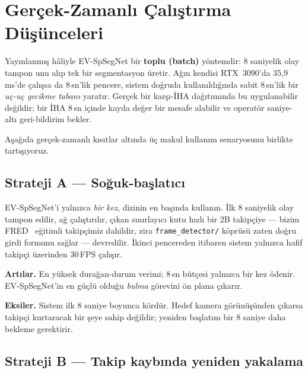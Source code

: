 \documentclass[11pt,a4paper]{article}
\begin{document}
\section{Ger\c{c}ek-Zamanl{\i} \c{C}al{\i}\c{s}t{\i}rma D\"u\c{s}\"unceleri}\label{sec:realtime}
Yay{\i}nlanm{\i}\c{s} h\^aliyle EV-SpSegNet bir \textbf{toplu (batch)}
y\"ontemdir: 8 saniyelik olay tampon\hskip0pt unu al{\i}p tek bir
segmentasyon \"uretir. A\u{g}{\i}n kendisi RTX~3090'da 35{,}9\,ms'de
\c{c}al{\i}\c{s}sa da 8\,sn'lik pencere, sistem do\u{g}ruda kullan{\i}ld{\i}\u{g}{\i}nda
sabit 8\,sn'lik bir \emph{u\c{c}-u\c{c} gecikme taban{\i}}
yarat{\i}r. Ger\c{c}ek bir kar\c{s}{\i}-\.{I}HA da\u{g}{\i}t{\i}m{\i}nda
bu uygulanabilir de\u{g}ildir; bir \.{I}HA 8\,sn i\c{c}inde
kayda de\u{g}er bir mesafe alabilir ve operat\"or saniye-alt{\i}
geri-bildirim bekler.

A\c{s}a\u{g}{\i}da ger\c{c}ek-zamanl{\i} k{\i}s{\i}tlar alt{\i}nda \"u\c{c}
makul kullan{\i}m senaryosunu birlikte tart{\i}\c{s}{\i}yoruz.

\subsection{Strateji A --- So\u{g}uk-ba\c{s}lat{\i}c{\i}}

EV-SpSegNet'i yaln{\i}zca \emph{bir kez}, dizinin en ba\c{s}{\i}nda
kullan{\i}n. \.{I}lk 8 saniyelik olay tampon edilir, a\u{g}
\c{c}al{\i}\c{s}t{\i}r{\i}l{\i}r, \c{c}{\i}kan s{\i}n{\i}rlay{\i}c{\i}
kutu h{\i}zl{\i} bir 2B takip\c{c}iye --- bizim FRED~\cite{magrini2025fred}
e\u{g}itimli takip\c{c}imiz dahildir, zira
\texttt{frame\_detector/} k\"opr\"us\"u zaten do\u{g}ru girdi
formunu sa\u{g}lar --- devredilir. \.{I}kinci pencereden itibaren
sistem yaln{\i}zca hafif takip\c{c}i \"uzerinden 30\,FPS \c{c}al{\i}\c{s}{\i}r.

\textbf{Art{\i}lar.} En y\"uksek dura\u{g}an-durum verimi; 8\,sn
b\"ut\c{c}esi yaln{\i}zca bir kez \"odenir. EV-SpSegNet'in en
g\"u\c{c}l\"u oldu\u{g}u \emph{bulma} g\"orevini \"on plana
\c{c}{\i}kar{\i}r.

\textbf{Eksiler.} Sistem ilk 8 saniye boyunca k\"ord\"ur. Hedef
kamera g\"or\"un\"u\c{s}\"unden \c{c}{\i}karsa takip\c{c}i kurtaracak
bir \c{s}eye sahip de\u{g}ildir; yeniden ba\c{s}lat{\i}m bir 8 saniye
daha bekleme gerektirir.

\subsection{Strateji B --- Takip kayb{\i}nda yeniden yakalama}
\end{document}
